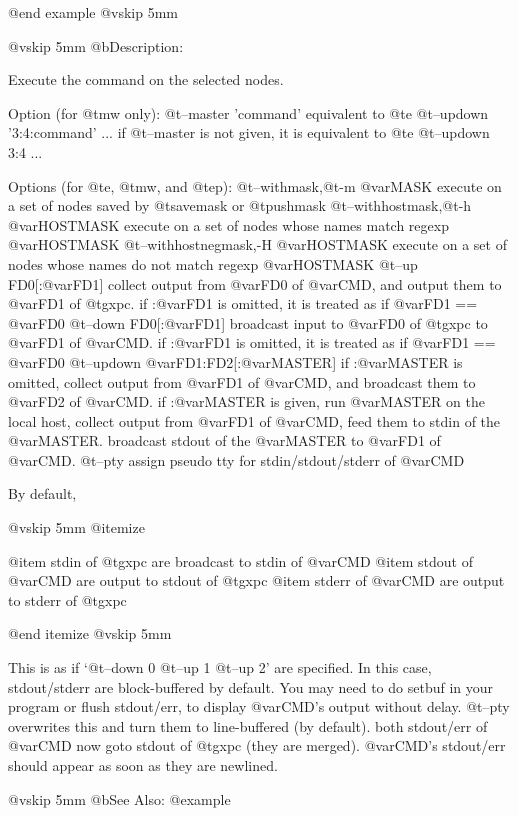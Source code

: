 @end example
@vskip 5mm

@vskip 5mm
@b{Description:}


  Execute the command on the selected nodes.

Option (for @t{mw} only):
  @t{--master} 'command'
    equivalent to @t{e} @t{--updown} '3:4:command' ...
  if @t{--master} is not given, it is equivalent to @t{e} @t{--updown} 3:4 ...

Options (for @t{e}, @t{mw}, and @t{ep}):
  @t{--withmask},@t{-m} @var{MASK}
    execute on a set of nodes saved by @t{savemask} or @t{pushmask}
  @t{--withhostmask},@t{-h} @var{HOSTMASK}
    execute on a set of nodes whose names match regexp @var{HOSTMASK}
  @t{--withhostnegmask},-H @var{HOSTMASK}
    execute on a set of nodes whose names do not match regexp @var{HOSTMASK}
  @t{--up} FD0[:@var{FD1}]
    collect output from @var{FD0} of @var{CMD}, and output them to @var{FD1} of @t{gxpc}.
    if :@var{FD1} is omitted, it is treated as if @var{FD1} == @var{FD0}
  @t{--down} FD0[:@var{FD1}]
    broadcast input to @var{FD0} of @t{gxpc} to @var{FD1} of @var{CMD}.
    if :@var{FD1} is omitted, it is treated as if @var{FD1} == @var{FD0}
  @t{--updown} @var{FD1}:FD2[:@var{MASTER}]
    if :@var{MASTER} is omitted, collect output from @var{FD1} of @var{CMD},
    and broadcast them to @var{FD2} of @var{CMD}.
    if :@var{MASTER} is given, run @var{MASTER} on the local host, collect
    output from @var{FD1} of @var{CMD}, feed them to stdin of the @var{MASTER}.
    broadcast stdout of the @var{MASTER} to @var{FD1} of @var{CMD}.
  @t{--pty}
    assign pseudo tty for stdin/stdout/stderr of @var{CMD}

By default,

@vskip 5mm
@itemize

@item  stdin of @t{gxpc} are broadcast to stdin of @var{CMD}
@item  stdout of @var{CMD} are output to stdout of @t{gxpc}
@item  stderr of @var{CMD} are output to stderr of @t{gxpc}

@end itemize
@vskip 5mm

This is as if `@t{--down} 0 @t{--up} 1 @t{--up} 2' are specified.  In this
case, stdout/stderr are block-buffered by default.  You may need
to do setbuf in your program or flush stdout/err, to display
@var{CMD}'s output without delay.  @t{--pty} overwrites this and turn them
to line-buffered (by default).  both stdout/err of @var{CMD} now goto
stdout of @t{gxpc} (they are merged).  @var{CMD}'s stdout/err should appear
as soon as they are newlined.

@vskip 5mm
@b{See Also:}
@example

